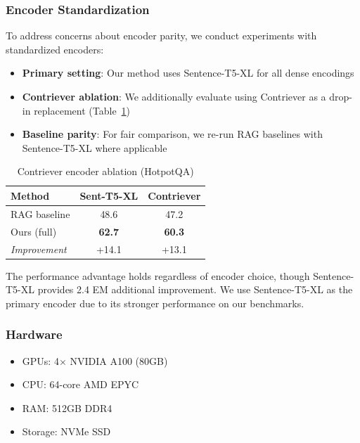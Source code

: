 \documentclass[10pt,twocolumn]{article}
\begin{document}
\subsubsection{Encoder Standardization}
\label{sec:encoder_standard}

To address concerns about encoder parity, we conduct experiments with standardized encoders:

\begin{itemize}
    \item \textbf{Primary setting}: Our method uses Sentence-T5-XL for all dense encodings
    \item \textbf{Contriever ablation}: We additionally evaluate using Contriever \cite{izacard2022contriever} as a drop-in replacement (Table~\ref{tab:contriever_ablation})
    \item \textbf{Baseline parity}: For fair comparison, we re-run RAG baselines with Sentence-T5-XL where applicable
\end{itemize}

\begin{table}[h]
\centering
\caption{Contriever encoder ablation (HotpotQA)}
\label{tab:contriever_ablation}
\small
\begin{tabular}{@{}lcc@{}}
\toprule
\textbf{Method} & \textbf{Sent-T5-XL} & \textbf{Contriever} \\
\midrule
RAG baseline & 48.6 & 47.2 \\
Ours (full) & \textbf{62.7} & \textbf{60.3} \\
\midrule
\textit{Improvement} & +14.1 & +13.1 \\
\bottomrule
\end{tabular}
\end{table}

The performance advantage holds regardless of encoder choice, though Sentence-T5-XL provides 2.4 EM additional improvement. We use Sentence-T5-XL as the primary encoder due to its stronger performance on our benchmarks.


\subsubsection{Hardware}
\begin{itemize}
    \item GPUs: 4$\times$ NVIDIA A100 (80GB)
    \item CPU: 64-core AMD EPYC
    \item RAM: 512GB DDR4
    \item Storage: NVMe SSD
\end{itemize}
\end{document}

